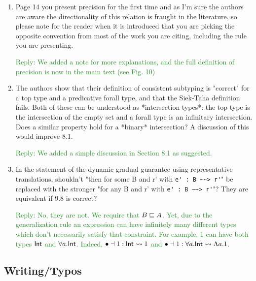 \documentclass[dvipsnames]{article}
\newcommand\reply[1]{\textcolor{ForestGreen}{Reply: #1}}
\begin{document}
\begin{enumerate}
  \reply{Fixed. We now mentioned this observation in Section 4.1 where we define
    consistency.}

 \item Page 14 you present precision for the first time and as I'm sure the
   authors are aware the directionality of this relation is fraught in the
   literature, so please note for the reader when it is introduced that you are
   picking the opposite convention from most of the work you are citing,
   including the rule you are presenting.

  \reply{We added a note for more explanations, and the full definition of
    precision is now in the main text (see Fig. 10)}

\item The authors show that their definition of consistent subtyping is
  "correct" for a top type and a predicative forall type, and that the Siek-Taha
  definition fails. Both of these can be understood as *intersection types*: the
  top type is the intersection of the empty set and a forall type is an
  infinitary intersection. Does a similar property hold for a *binary*
  intersection? A discussion of this would improve 8.1.

  \reply{We added a simple discussion in Section 8.1 as suggested.}

\item In the statement of the dynamic gradual guarantee using representative
  translations, shouldn't "then for some B and r' with \verb|e' : B ~~> r'|" be
  replaced with the stronger "for any B and r' with \verb|e' : B ~~> r'|"? They are
  equivalent if 9.8 is correct?

  \reply{No, they are not. We require that $B \sqsubseteq A$. Yet, due to the generalization rule
    an expression can have infinitely many different types which don't
    necessarily satisfy that constraint. For example, $1$ can have both types $\mathsf{Int}$ and $\forall a. \mathsf{Int}$. Indeed,
    $\bullet \dashv 1 : \mathsf{Int} \rightsquigarrow 1$ and
    $\bullet \dashv 1 : \forall a. \mathsf{Int} \rightsquigarrow \Lambda a.
    1$.}

\end{enumerate}


\subsection{Writing/Typos }
\end{document}
